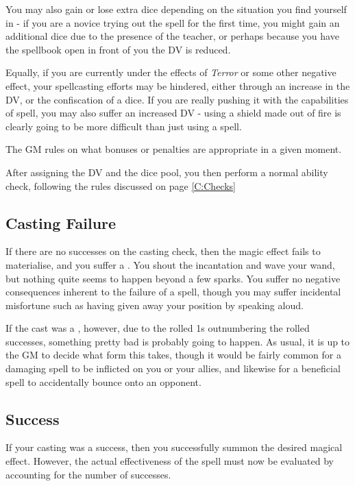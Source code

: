 You may also gain or lose extra dice depending on the situation you find yourself in - if you are a novice trying out the spell for the first time, you might gain an additional dice due to the presence of the teacher, or perhaps because you have the spellbook open in front of you the DV is reduced. 

Equally, if you are currently under the effects of {\it Terror} or some other negative effect, your spellcasting efforts may be hindered, either through an increase in the DV, or the confiscation of a dice. If you are really pushing it with the capabilities of spell, you may also suffer an increased DV - using a shield made out of fire is clearly going to be more difficult than just using a  spell. 

The GM rules on what bonuses or penalties are appropriate in a given moment. 

After assigning the DV and the dice pool, you then perform a normal ability check, following the rules discussed on page \ref{C:Checks}

\subsection{Casting Failure}

If there are no successes on the casting check, then the magic effect fails to materialise, and you suffer a . You shout the incantation and wave your wand, but nothing quite seems to happen beyond a few sparks. You suffer no negative consequences inherent to the failure of a spell, though you may suffer incidental misfortune such as having given away your position by speaking aloud. 

If the cast was a , however, due to the rolled 1s outnumbering the rolled successes, something pretty bad is probably going to happen. As usual, it is up to the GM to decide what form this takes, though it would be fairly common for a damaging spell to be inflicted on you or your allies, and likewise for a beneficial spell to accidentally bounce onto an opponent. 



\subsection{Success}

If your casting was a success, then you successfully summon the desired magical effect. However, the actual effectiveness of the spell must now be evaluated by accounting for the number of successes. 


